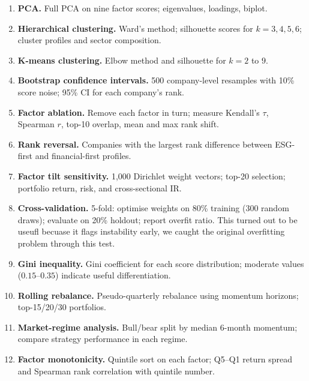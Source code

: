 \begin{enumerate}
    \item \textbf{PCA.} Full PCA on nine factor scores; eigenvalues, loadings, biplot.

    \item \textbf{Hierarchical clustering.} Ward's method; silhouette scores for $k = 3, 4, 5, 6$; cluster profiles and sector composition.

    \item \textbf{K-means clustering.} Elbow method and silhouette for $k = 2$ to $9$.

    \item \textbf{Bootstrap confidence intervals.} 500 company-level resamples with 10\% score noise; 95\% CI for each company's rank.

    \item \textbf{Factor ablation.} Remove each factor in turn; measure Kendall's $\tau$, Spearman $r$, top-10 overlap, mean and max rank shift.

    \item \textbf{Rank reversal.} Companies with the largest rank difference between ESG-first and financial-first profiles.

    \item \textbf{Factor tilt sensitivity.} 1,000 Dirichlet weight vectors; top-20 selection; portfolio return, risk, and cross-sectional IR.

    \item \textbf{Cross-validation.} 5-fold: optimise weights on 80\% training (300 random draws); evaluate on 20\% holdout; report overfit ratio. This turned out to be useufl becuase it flags instability early, we caught the original overfitting problem through this test.

    \item \textbf{Gini inequality.} Gini coefficient for each score distribution; moderate values ($0.15$--$0.35$) indicate useful differentiation.
    \item \textbf{Rolling rebalance.} Pseudo-quarterly rebalance using momentum horizons; top-15/20/30 portfolios.

    \item \textbf{Market-regime analysis.} Bull/bear split by median 6-month momentum; compare strategy performance in each regime.

    \item \textbf{Factor monotonicity.} Quintile sort on each factor; Q5--Q1 return spread and Spearman rank correlation with quintile number.
\end{enumerate}
